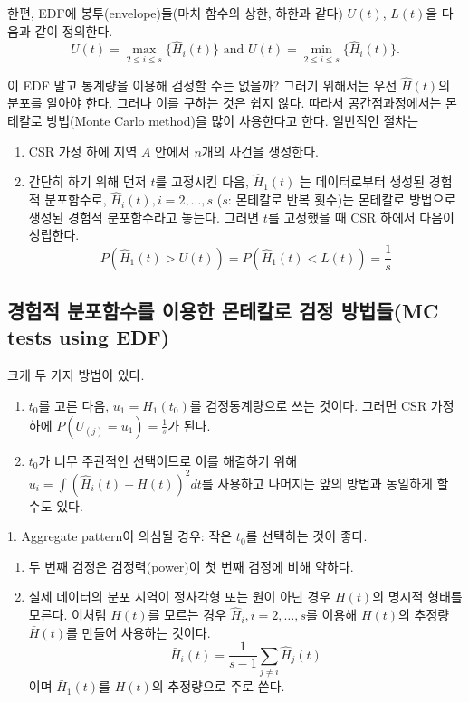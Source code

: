 \documentclass[b5paper,]{scrbook}
\theoremstyle{plain}
\theoremstyle{definition}
\numberwithin{equation}{section}
\let\BeginKnitrBlock\begin \let\EndKnitrBlock\end
\begin{document}
한편, EDF에 봉투(envelope)들(마치 함수의 상한, 하한과 같다) \(U(t)\), \(L(t)\)을 다음과 같이 정의한다.
\[U(t)=\max_{2\leq i \leq s}\{\hat{H}_{i}(t)\} \text{ and } U(t)=\min_{2\leq i \leq s}\{\hat{H}_{i}(t)\}.\]

이 EDF 말고 통계량을 이용해 검정할 수는 없을까? 그러기 위해서는 우선 \(\hat{H}(t)\)의 분포를 알아야 한다. 그러나 이를 구하는 것은 쉽지 않다. 따라서 공간점과정에서는 몬테칼로 방법(Monte Carlo method)을 많이 사용한다고 한다. 일반적인 절차는

\begin{enumerate}
\def\labelenumi{\arabic{enumi}.}
\item
  CSR 가정 하에 지역 \(A\) 안에서 \(n\)개의 사건을 생성한다.
\item
  간단히 하기 위해 먼저 \(t\)를 고정시킨 다음, \(\hat{H}_{1}(t)\) 는 데이터로부터 생성된 경험적 분포함수로, \(\hat{H}_{i}(t), i=2,\ldots, s\) (\(s\): 몬테칼로 반복 횟수)는 몬테칼로 방법으로 생성된 경험적 분포함수라고 놓는다. 그러면 \(t\)를 고정했을 때 CSR 하에서 다음이 성립한다.
  \[P(\hat{H}_{1}(t)>U(t))=P(\hat{H}_{1}(t)<L(t))=\frac{1}{s}\]
\end{enumerate}

\hypertarget{-----mc-tests-using-edf}{%
\subsection{경험적 분포함수를 이용한 몬테칼로 검정 방법들(MC tests using EDF)}\label{-----mc-tests-using-edf}}

크게 두 가지 방법이 있다.

\begin{enumerate}
\def\labelenumi{\arabic{enumi}.}
\item
  \(t_{0}\)를 고른 다음, \(u_{1}=\hat{H}_{1}(t_{0})\)를 검정통계량으로 쓰는 것이다. 그러면 CSR 가정 하에 \(P(U_{(j)}=u_{1})=\frac{1}{s}\)가 된다.
\item
  \(t_{0}\)가 너무 주관적인 선택이므로 이를 해결하기 위해 \(u_{i}=\int (\hat{H}_{i}(t)-H(t) )^{2}dt\)를 사용하고 나머지는 앞의 방법과 동일하게 할 수도 있다.
\end{enumerate}

\BeginKnitrBlock{corollary}
\protect\hypertarget{cor:unnamed-chunk-386}{}{\label{cor:unnamed-chunk-386} }1. Aggregate pattern이 의심될 경우: 작은 \(t_{0}\)를 선택하는 것이 좋다.

\begin{enumerate}
\def\labelenumi{\arabic{enumi}.}
\setcounter{enumi}{1}
\item
  두 번째 검정은 검정력(power)이 첫 번째 검정에 비해 약하다.
\item
  실제 데이터의 분포 지역이 정사각형 또는 원이 아닌 경우 \(H(t)\)의 명시적 형태를 모른다. 이처럼 \(H(t)\)를 모르는 경우 \(\hat{H}_{i}, i=2,\ldots, s\)를 이용해 \(H(t)\)의 추정량 \(\bar{H}(t)\)를 만들어 사용하는 것이다.
  \[\bar{H}_{i}(t)=\frac{1}{s-1}\sum_{j\neq i}\hat{H}_{j}(t)\]
  이며 \(\bar{H}_{1}(t)\)를 \(H(t)\)의 추정량으로 주로 쓴다.
\end{enumerate}
\EndKnitrBlock{corollary}
\end{document}
